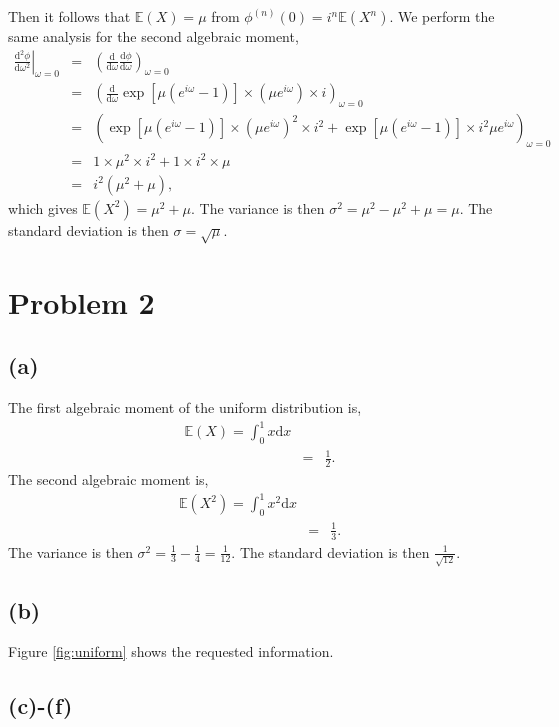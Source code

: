 \documentclass[12pt]{article}
\begin{document}
Then it follows that $\mathbb{E}(X) = \mu$ from $\phi^{(n)}(0) = i^n \mathbb{E}(X^n)$. We perform the same analysis for the second algebraic moment,
\begin{eqnarray}
\left. \frac{\text{d}^2 \phi}{\text{d} \omega^2} \right \vert_{\omega = 0} &=& \left(\frac{\text{d}}{\text{d} \omega} \frac{\text{d} \phi}{\text{d} \omega}\right)_{\omega = 0 }\\
&=&\left(\frac{\text{d}}{\text{d} \omega} \exp\left[ \mu \left( e^{i \omega } - 1\right)\right] \times \left(\mu e^{ i \omega }  \right) \times i\right)_{\omega = 0}\\
&=& \left( \exp\left[ \mu \left( e^{i \omega } - 1\right)\right] \times \left(\mu e^{ i \omega }  \right)^2 \times i^2 + \exp\left[ \mu \left( e^{i \omega } - 1\right)\right] \times i^2 \mu e^{i \omega}\right)_{\omega=0}\\
&=& 1 \times \mu^2 \times i^2 + 1 \times i^2 \times \mu\\
&=& i^2(\mu^2 + \mu),
\end{eqnarray}
which gives $\mathbb{E}(X^2) = \mu^2 + \mu$.  The variance is then $\sigma^2 =  \mu^2 - \mu^2 + \mu = \mu$. The standard deviation is then $\sigma = \sqrt{\mu}$.

\section*{Problem 2}
\subsection*{(a)}
The first algebraic moment of the uniform distribution is,
\begin{eqnarray}
\mathbb{E}(X) = \int_0^1 x \text{d} x\\
&=& \frac{1}{2}.
\end{eqnarray}
The second algebraic moment is,
\begin{eqnarray}
\mathbb{E}(X^2) = \int_0^1 x^2 \text{d}x\\
&=& \frac{1}{3}.
\end{eqnarray}
The variance is then $\sigma^2 = \frac{1}{3} - \frac{1}{4} =  \frac{1}{12}$.  The standard deviation is then $\frac{1}{\sqrt{12}}$.

\subsection*{(b)}
Figure \ref{fig:uniform} shows the requested information.

\subsection*{(c)-(f)}
\end{document}
